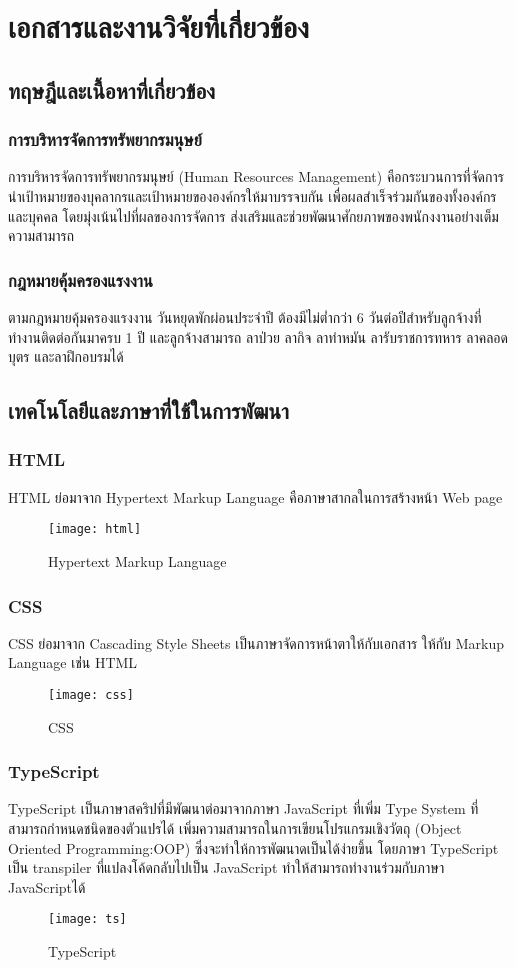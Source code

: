 \chapter{เอกสารและงานวิจัยที่เกี่ยวข้อง}
\label{chapter:related-theory}

\section{ทฤษฎีและเนื้อหาที่เกี่ยวข้อง}
\subsection{การบริหารจัดการทรัพยากรมนุษย์}
การบริหารจัดการทรัพยากรมนุษย์ (Human Resources Management) คือกระบวนการที่จัดการนำเป้าหมายของบุคลากรและเป้าหมายขององค์กรให้มาบรรจบกัน เพื่อผลสำเร็จร่วมกันของทั้งองค์กรและบุคคล โดยมุ่งเน้นไปที่ผลของการจัดการ ส่งเสริมและช่วยพัฒนาศักยภาพของพนักงงานอย่างเต็มความสามารถ
\subsection{กฎหมายคุ้มครองแรงงาน}
ตามกฎหมายคุ้มครองแรงงาน วันหยุดพักผ่อนประจำปี ต้องมีไม่ต่ำกว่า 6 วันต่อปีสำหรับลูกจ้างที่ทำงานติดต่อกันมาครบ 1 ปี และลูกจ้างสามารถ ลาป่วย ลากิจ ลาทำหมัน ลารับราชการทหาร ลาคลอดบุตร และลาฝึกอบรมได้

\section{เทคโนโลยีและภาษาที่ใช้ในการพัฒนา}
\subsection{HTML}
HTML ย่อมาจาก Hypertext Markup Language  คือภาษาสากลในการสร้างหน้า Web page
\begin{figure}[!h]
	\centering
	\texttt{[image: html]}
	\caption{Hypertext Markup Language}
	\label{Fig:HTML}
\end{figure}
\newpage
\subsection{CSS}
CSS ย่อมาจาก Cascading Style Sheets เป็นภาษาจัดการหน้าตาให้กับเอกสาร ให้กับ Markup Language เช่่น HTML
\begin{figure}[!h]
	\centering
	\texttt{[image: css]}
	\caption{CSS}
	\label{Fig:CSS}
\end{figure}

\subsection{TypeScript}
TypeScript เป็นภาษาสคริปที่มีพัฒนาต่อมาจากภาษา JavaScript ที่เพิ่ม Type System ที่สามารถกำหนดชนิดของตัวแปรได้
เพิ่มความสามารถในการเขียนโปรแกรมเชิงวัตถุ (Object Oriented Programming:OOP) ซึ่งจะทำให้การพัฒนาดเป็นได้ง่ายขึ้น
โดยภาษา TypeScript เป็น transpiler ที่แปลงโค้ดกลับไปเป็น JavaScript ทำให้สามารถทำงานร่วมกับภาษา JavaScriptได้
\begin{figure}[!h]
	\centering
	\texttt{[image: ts]}
	\caption{TypeScript}
	\label{Fig:TypeScript}
\end{figure}

